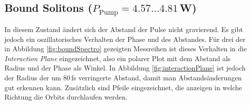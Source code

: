 \documentclass[bachelor,       %
               twoside,        %
               BCOR10mm,       %
               english,ngerman, %
               ]{GAUBM}
\begin{document}
\subsection{Bound Solitons ($P_\text{Pump}=4.57\dots4.81\,$W)}
In diesem Zustand ändert sich der Abstand der Pulse nicht gravierend.
Es gibt jedoch ein oszillatorisches Verhalten der Phase und des Abstandes.
Für drei der in Abbildung \ref{fig:boundSpectro} gezeigten Messreihen ist dieses Verhalten in die \textit{Interaction Plane} eingezeichnet, also ein polarer Plot mit dem Abstand als Radius und der Phase als Winkel.
In Abbildung \ref{fig:interactionPlane} ist jedoch der Radius der um 80\,fs verringerte Abstand, damit man Abstandsänderungen gut erkennen kann.
Zusätzlich sind Pfeile eingezeichnet, die anzeigen in welche Richtung die Orbits durchlaufen werden.
\begin{figure}[!htb]
   \centering
   \hfill
   

\end{figure}
\end{document}
